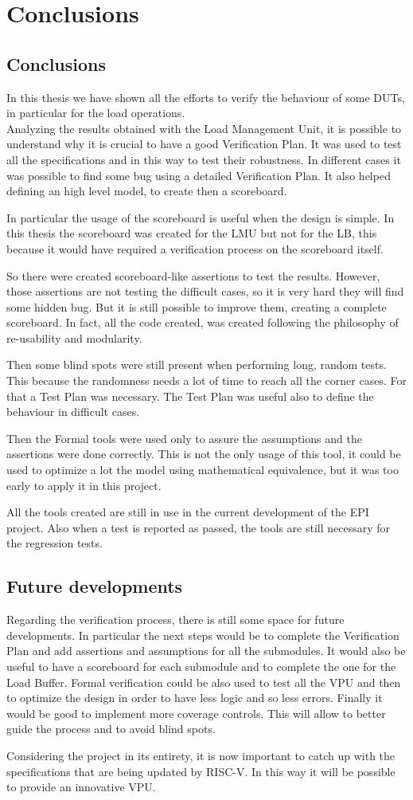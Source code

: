 \chapter{Conclusions}
\section{Conclusions}
In this thesis we have shown all the efforts to verify the behaviour of some DUTs, in particular for the load operations.\\

Analyzing the results obtained with the Load Management Unit, it is possible to understand why it is crucial to have a good Verification Plan. It was used to test all the specifications and in this way to test their robustness. In different cases it was possible to find some bug using a detailed Verification Plan. It also helped defining an high level model, to create then a scoreboard.

In particular the usage of the scoreboard is useful when the design is simple. In this thesis the scoreboard was created for the LMU but not for the LB, this because it would have required a verification process on the scoreboard itself.

So there were created scoreboard-like assertions to test the results. However, those assertions are not testing the difficult cases, so it is very hard they will find some hidden bug. 
But it is still possible to improve them, creating a complete scoreboard. In fact, all the code created, was created following the philosophy of re-usability and modularity.

Then some blind spots were still present when performing long, random tests. This because the randomness needs a lot of time to reach all the corner cases. For that a Test Plan was necessary.
The Test Plan was useful also to define the behaviour in difficult cases.

Then the Formal tools were used only to assure the assumptions and the assertions were done correctly. This is not the only usage of this tool, it could be used to optimize a lot the model using mathematical equivalence, but it was too early to apply it in this project.

All the tools created are still in use in the current development of the EPI project. Also when a test is reported as passed, the tools are still necessary for the regression tests.



\section{Future developments}
Regarding the verification process, there is still some space for future developments. In particular the next steps would be to complete the Verification Plan and add assertions and assumptions for all the submodules. 
It would also be useful to have a scoreboard for each submodule and to complete the one for the Load Buffer.
Formal verification could be also used to test all the VPU and then to optimize the design in order to have less logic and so less errors.
Finally it would be good to implement more coverage controls. This will allow to better guide the process and to avoid blind spots.

Considering the project in its entirety, it is now important to catch up with the specifications that are being updated by RISC-V. In this way it will be possible to provide an innovative VPU.